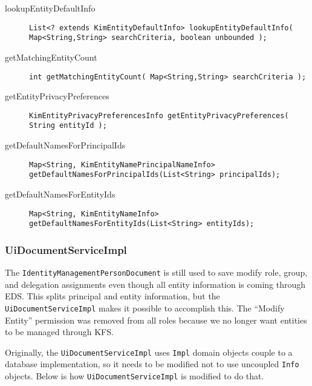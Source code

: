 \documentclass[12pt,notitlepage]{article}
\begin{document}
\begin{description}
\item[lookupEntityDefaultInfo]
\begin{lstlisting}
List<? extends KimEntityDefaultInfo> lookupEntityDefaultInfo( Map<String,String> searchCriteria, boolean unbounded );
\end{lstlisting}

\item[getMatchingEntityCount]
\begin{lstlisting}
int getMatchingEntityCount( Map<String,String> searchCriteria );
\end{lstlisting}

\item[getEntityPrivacyPreferences]
\begin{lstlisting}
KimEntityPrivacyPreferencesInfo getEntityPrivacyPreferences( String entityId );
\end{lstlisting}

\item[getDefaultNamesForPrincipalIds]
\begin{lstlisting}
Map<String, KimEntityNamePrincipalNameInfo> getDefaultNamesForPrincipalIds(List<String> principalIds);
\end{lstlisting}

\item[getDefaultNamesForEntityIds]
\begin{lstlisting}
Map<String, KimEntityNameInfo> getDefaultNamesForEntityIds(List<String> entityIds);
\end{lstlisting}
\end{description}

\subsubsection{UiDocumentServiceImpl}
The \verb|IdentityManagementPersonDocument| is still used to save modify role, group, and delegation assignments
even though all entity information is coming through EDS. This splits principal and entity information, but
the \verb|UiDocumentServiceImpl| makes it possible to accomplish this. The ``Modify Entity'' permission was
removed from all roles because we no longer want entities to be managed through KFS.

Originally, the \verb|UiDocumentServiceImpl|
uses \verb|Impl| domain objects couple to a database implementation, so it needs to be modified not to use uncoupled
\verb|Info| objects. Below is how \verb|UiDocumentServiceImpl| is modified to do that.
\end{document}
